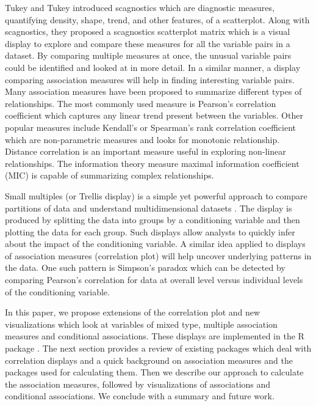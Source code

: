 Tukey and Tukey \citep{tukey1985computer} introduced scagnostics which
are diagnostic measures, quantifying density, shape, trend, and other
features, of a scatterplot. Along with scagnostics, they proposed a
scagnostics scatterplot matrix which is a visual display to explore and
compare these measures for all the variable pairs in a dataset. By
comparing multiple measures at once, the unusual variable pairs could be
identified and looked at in more detail. In a similar manner, a display
comparing association measures will help in finding interesting variable
pairs. Many association measures have been proposed to summarize
different types of relationships. The most commonly used measure is
Pearson's correlation coefficient which captures any linear trend
present between the variables. Other popular measures include Kendall's
or Spearman's rank correlation coefficient which are non-parametric
measures and looks for monotonic relationship. Distance correlation
\citep{szekely2007measuring} is an important measure useful in exploring
non-linear relationships. The information theory measure maximal
information coefficient (MIC) \citep{reshef2011detecting} is capable of
summarizing complex relationships.

Small multiples (or Trellis display) is a simple yet powerful approach
to compare partitions of data and understand multidimensional datasets
\citep{tufte1986thevisual}. The display is produced by splitting the
data into groups by a conditioning variable and then plotting the data
for each group. Such displays allow analysts to quickly infer about the
impact of the conditioning variable. A similar idea applied to displays
of association measures (correlation plot) will help uncover underlying
patterns in the data. One such pattern is Simpson's paradox which can be
detected by comparing Pearson's correlation for data at overall level
versus individual levels of the conditioning variable.

In this paper, we propose extensions of the correlation plot and new
visualizations which look at variables of mixed type, multiple
association measures and conditional associations. These displays are
implemented in the R package . The next section provides
a review of existing packages which deal with correlation displays and a
quick background on association measures and the packages used for
calculating them. Then we describe our approach to calculate the
association measures, followed by visualizations of associations and
conditional associations. We conclude with a summary and future work.

